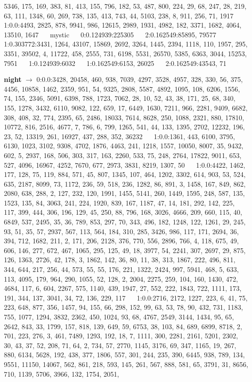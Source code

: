 \documentclass[a4paper,11pt,oneside]{book}
\begin{document}
5346, 175, 169, 383, 81, 413, 155, 796, 182, 53, 487, 800, 224, 29, 68, 247, 28, 219, 63, 111, 1348, 60, 269, 738, 135, 413, 743, 44, 5103, 238, 8, 911, 256, 71, 1917	$\quad$	1:0.0:4493, 2825, 878, 9941, 986, 12615, 2989, 1931, 4982, 182, 3371, 1682, 4064, 13510, 1647	$\quad$	
mystic	$\quad$	0:0.124939:225305	$\quad$	2:0.162549:85895, 79577	$\quad$	1:0.303772:3431, 1264, 43107, 15869, 2692, 3264, 1445, 2394, 1118, 110, 1957, 295, 3351, 39502, 4, 11722, 458, 2555, 731, 6198, 5531, 26570, 5385, 6363, 3044, 15253, 7951	$\quad$	1:0.124939:6032	$\quad$	1:0.162549:6153, 26025	$\quad$	2:0.162549:43543, 71	$\quad$	

\textbf{night} $\rightarrow$	0:0.0:3428, 20458, 460, 938, 7039, 4297, 3528, 4957, 328, 330, 56, 375, 4456, 10858, 1462, 2359, 951, 54, 9325, 2808, 5587, 4892, 1095, 108, 6206, 1556, 74, 155, 2346, 5091, 6398, 788, 1723, 7062, 28, 10, 52, 43, 38, 171, 25, 68, 340, 155, 1278, 3432, 6110, 9082, 122, 659, 17, 6449, 1630, 7211, 966, 2281, 9409, 6682, 308, 408, 32, 774, 2395, 65, 2486, 18033, 7614, 8628, 250, 1088, 2321, 880, 17810, 10772, 816, 2516, 4677, 7, 786, 6, 799, 1265, 541, 44, 133, 1395, 2702, 12232, 196, 23, 52, 13319, 261, 16927, 437, 288, 352, 36232	$\quad$	1:0.0:1361, 443, 6100, 3795, 6130, 1023, 3102, 9308, 4702, 1876, 4463, 241, 1218, 1557, 10050, 8007, 35, 9432, 602, 5, 2937, 168, 506, 303, 317, 163, 2260, 533, 75, 248, 2764, 17822, 9011, 653, 527, 4096, 16967, 4252, 7670, 677, 2973, 3831, 8219, 1307, 50	$\quad$	1:0.0:4422, 1462, 177, 128, 75, 119, 884, 571, 45, 807, 1345, 107, 464, 1202, 3302, 614, 903, 53, 524, 635, 2187, 8099, 73, 1172, 236, 59, 518, 236, 1282, 86, 891, 3, 1458, 167, 849, 862, 2080, 638, 288, 2, 127, 232, 120, 1991, 1455, 5141, 260, 1449, 1595, 248, 587, 135, 1523, 135, 84, 3063, 241, 224, 1920, 839, 167, 1187, 47, 14, 181, 292, 142, 225, 117, 399, 444, 306, 196, 129, 45, 250, 88, 796, 168, 3026, 4666, 209, 660, 115, 40, 6849, 537, 2495, 35, 36, 789, 853, 297, 70, 343, 496, 182, 1248, 122, 1261, 29, 245, 93, 51, 35, 57, 2937, 567, 113, 564, 184, 310, 285, 3426, 986, 117, 171, 2694, 36, 394, 712, 1682, 211, 2, 171, 206, 2128, 376, 770, 556, 2896, 766, 4, 118, 675, 49, 606, 146, 277, 672, 467, 1065, 295, 125, 49, 18, 3977, 54, 2241, 307, 2697, 29, 875, 126, 1363, 2726, 42, 178, 3, 1862, 142, 36, 80, 11, 38, 313, 1867, 222, 496, 811, 344, 644, 217, 256, 44, 573, 55, 55, 176, 221, 1322, 2424, 997, 5941, 468, 5, 633, 113, 4095, 179, 964, 290, 1055, 52, 128, 2, 2004, 2275, 259, 104, 160, 1430, 472, 4684, 117, 6, 604, 2267, 575, 1140, 439, 1947, 27, 552, 222, 1843, 722, 1111, 173, 191, 344, 137, 3041, 34, 72, 136, 229, 117	$\quad$	1:0.0:2716, 2172, 1227, 223, 6, 41, 75, 223, 648, 877, 356, 1457, 94, 155, 66, 298, 152, 99, 63, 53, 78, 90, 432, 731, 1183, 755, 1077, 1294, 3832, 2362, 450, 1024, 93, 68, 4767, 2549, 3144, 1434, 95, 65, 2642, 843, 33, 1799, 157, 818, 139, 649, 59, 6753, 38, 103, 84, 689, 6899, 8718, 2, 701, 223, 276, 3, 461, 7489, 1293, 192, 18, 7, 1111, 300, 2281, 2161, 5201, 2302, 30, 43, 37, 52, 208, 71, 64, 2, 734, 57, 2770, 1145, 3176, 69, 347, 1165, 19, 267, 880, 6134, 5628, 192, 438, 377, 1806, 557, 301, 244, 235, 390, 6445, 938, 789, 134, 9551, 11150, 14067, 562, 861, 218, 593, 145, 261, 567, 888, 581, 65, 3791, 31, 8656, 710, 1139, 5706, 3966, 132, 1754, 2051, 
\end{document}
